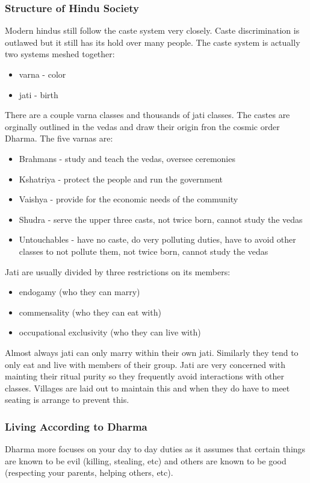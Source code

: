 \documentclass{article}
\begin{document}
\subsubsection{Structure of Hindu Society}
\label{ssub:structure_of_hindu_society}
Modern hindus still follow the caste system very closely. Caste discrimination is outlawed but it still has its hold over many people. The caste system is actually two systems meshed together:
\begin{itemize}
	\item varna - color
	\item jati - birth
\end{itemize}
There are a couple varna classes and thousands of jati classes. The castes are orginally outlined in the vedas and draw their origin fron the cosmic order Dharma. The five varnas are:
\begin{itemize}
	\item Brahmans - study and teach the vedas, oversee ceremonies
	\item Kshatriya - protect the people and run the government
	\item Vaishya - provide for the economic needs of the community
	\item Shudra - serve the upper three casts, not twice born, cannot study the vedas
	\item Untouchables - have no caste, do very polluting duties, have to avoid other classes to not pollute them, not twice born, cannot study the vedas
\end{itemize}

Jati are usually divided by three restrictions on its members:
\begin{itemize}
	\item endogamy (who they can marry)
	\item commensality (who they can eat with)
	\item occupational exclusivity (who they can live with)
\end{itemize}
Almost always jati can only marry within their own jati. Similarly they tend to only eat and live with members of their group. Jati are very concerned with mainting their ritual purity so they frequently avoid interactions with other classes. Villages are laid out to maintain this and when they do have to meet seating is arrange to prevent this.

\subsubsection{Living According to Dharma}
\label{ssub:living_according_to_dharma}
Dharma more focuses on your day to day duties as it assumes that certain things are known to be evil (killing, stealing, etc) and others are known to be good (respecting your parents, helping others, etc).
\end{document}
